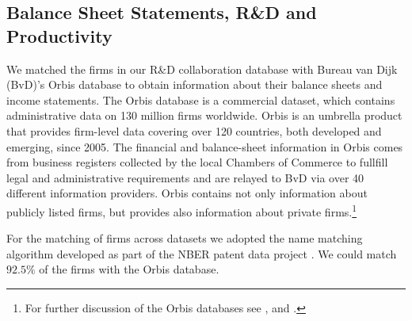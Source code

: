 \subsection{\protect Balance Sheet Statements, R\&D and
Productivity}
\label{sec:data-balance-sheets}
We matched the firms in our R\&D collaboration database with Bureau van Dijk
(BvD)'s Orbis database to obtain information about their balance sheets and income statements. The Orbis database is a
commercial dataset, which contains administrative data on 130 million firms
worldwide. Orbis is an umbrella product that provides firm-level data
covering over 120 countries, both developed and emerging, since 2005. The
financial and balance-sheet information in Orbis comes from business
registers collected by the local Chambers of Commerce to fullfill legal and
administrative requirements and are relayed to BvD via over 40 different
information providers. Orbis contains not only information about publicly listed firms, but provides also information about private firms.\footnote{For further discussion of the
 Orbis databases see \citet[][]{Dai2012}, \citet{Bloom2013} and \citet[][]{Papadopoulos2012}.}

For the matching of firms across datasets we adopted the name matching algorithm developed as part of the NBER patent data project \citep[][]{Trajtenberg2009}. We could match $92.5\%$ of the firms with the Orbis database.

